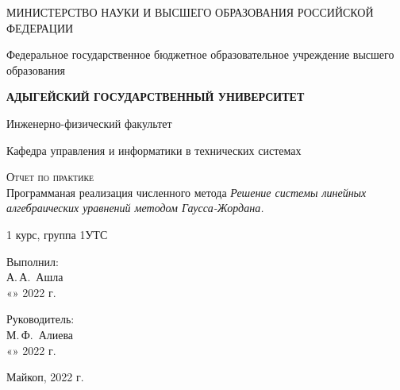 \documentclass[12pt,a4paper]{scrartcl}
\begin{document}
	\begin{titlepage}
		\begin{center}
			\large
			МИНИСТЕРСТВО НАУКИ И ВЫСШЕГО ОБРАЗОВАНИЯ РОССИЙСКОЙ ФЕДЕРАЦИИ
			
			Федеральное государственное бюджетное образовательное учреждение высшего образования
			
			\textbf{АДЫГЕЙСКИЙ ГОСУДАРСТВЕННЫЙ УНИВЕРСИТЕТ}
			\vspace{0.25cm}
			
			Инженерно-физический факультет
			
			Кафедра управления и информатики в технических системах
			\vfill
			
			\vfill
			
			\textsc{Отчет по практике}\\[5mm]
			
			{\LARGE Программаная реализация численного метода \textit{Решение системы линейных алгебраических уравнений методом Гаусса-Жордана.}}
			\bigskip
			
			1 курс, группа 1УТС
		\end{center}
		\vfill
		
		\newlength{\ML}
		\hfill\begin{minipage}{0.5\textwidth}
			Выполнил:\\
			\underline{\hspace{\ML}} А.\,А.~Ашла\\
			«\underline{\hspace{0.7cm}}» \underline{\hspace{2cm}} 2022 г.
		\end{minipage}%
		\bigskip
		
		\hfill\begin{minipage}{0.5\textwidth}
			Руководитель:\\
			\underline{\hspace{\ML}} М.\,Ф.~Алиева\\
			«\underline{\hspace{0.7cm}}» \underline{\hspace{2cm}} 2022 г.
		\end{minipage}%
		\vfill
		
		\begin{center}
			Майкоп, 2022 г.
		\end{center}
	\end{titlepage}
\end{document}
